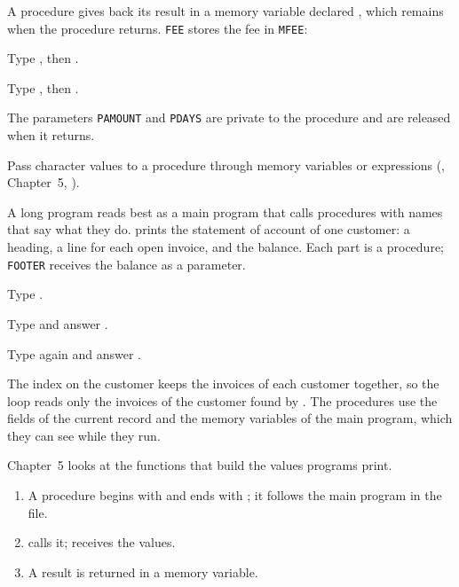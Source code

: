 A procedure gives back its result in a memory variable declared ,
which remains when the procedure returns.  \texttt{FEE} stores the fee in
\texttt{MFEE}:
\begin{Steps}
\item Type , then .
\item Type , then .
\end{Steps}
The parameters \texttt{PAMOUNT} and \texttt{PDAYS} are private to the procedure
and are released when it returns.

\begin{AteNote}
Pass character values to a procedure through memory variables or expressions
(, Chapter~5, ).
\end{AteNote}

A long program reads best as a main program that calls procedures with
names that say what they do.   prints the statement of
account of one customer: a heading, a line for each open invoice, and the
balance.  Each part is a procedure; \texttt{FOOTER} receives the balance as a
parameter.
\begin{Steps}
\item Type .
\item Type  and answer .
\item Type  again and answer .
\end{Steps}
The index on the customer keeps the invoices of each customer together, so the
loop  reads only the invoices of the customer
found by .  The procedures use the fields of the current record and
the memory variables of the main program, which they can see while they run.

Chapter~5 looks at the functions that build the values programs print.

\begin{enumerate}
\item A procedure begins with   and ends with
  ; it follows the main program in the file.
\item {}    calls it;
    receives the values.
\item A result is returned in a  memory variable.
\end{enumerate}
